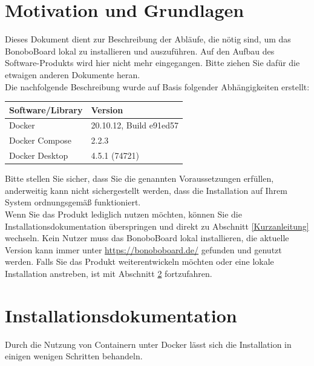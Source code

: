\documentclass[a4paper,11pt]{scrartcl}
\begin{document}
\section{Motivation und Grundlagen}\label{Grundlagen}
Dieses Dokument dient zur Beschreibung der Abläufe, die nötig sind, um das BonoboBoard lokal zu installieren und auszuführen. Auf den Aufbau des Software-Produkts wird hier nicht mehr eingegangen. Bitte ziehen Sie dafür die etwaigen anderen Dokumente heran.\\
Die nachfolgende Beschreibung wurde auf Basis folgender Abhängigkeiten erstellt:
\begin{table}[H]
\begin{tabular}{|p{5cm}|p{5cm}|}
\hline
\textbf{Software/Library} & \textbf{Version} \\ \hline
	Docker & 20.10.12, Build e91ed57 \\ \hline
	Docker Compose & 2.2.3\\ \hline
	Docker Desktop & 4.5.1 (74721)\\ \hline
\end{tabular}
\end{table}
\noindent
Bitte stellen Sie sicher, dass Sie die genannten Voraussetzungen erfüllen, anderweitig kann nicht sichergestellt werden, dass die Installation auf Ihrem System ordnungsgemäß funktioniert.\\

\noindent Wenn Sie das Produkt lediglich nutzen möchten, können Sie die Installationsdokumentation überspringen und direkt zu Abschnitt \ref{Kurzanleitung} wechseln. Kein Nutzer muss das BonoboBoard lokal installieren, die aktuelle Version kann immer unter \url{https://bonoboboard.de/} gefunden und genutzt werden. Falls Sie das Produkt weiterentwickeln möchten oder eine lokale Installation anstreben, ist mit Abschnitt \ref{Installationsdokumentation} fortzufahren. 

\section{Installationsdokumentation}\label{Installationsdokumentation}
Durch die Nutzung von Containern unter Docker lässt sich die Installation in einigen wenigen Schritten behandeln.
\end{document}
